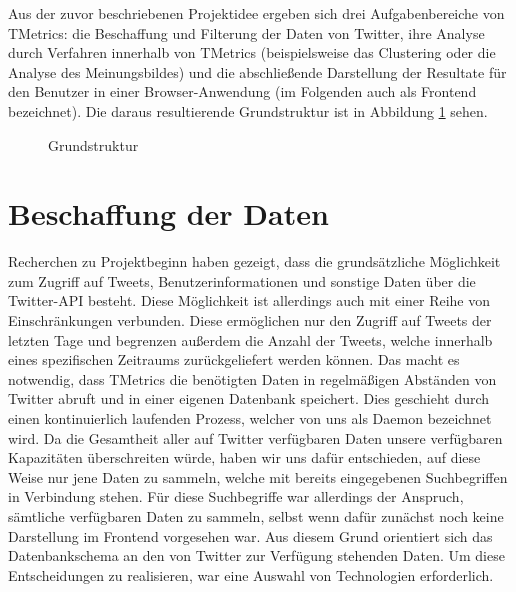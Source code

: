 Aus der zuvor beschriebenen Projektidee ergeben sich drei Aufgabenbereiche von TMetrics: die Beschaffung und Filterung der Daten von Twitter, ihre Analyse durch Verfahren innerhalb von TMetrics (beispielsweise das Clustering oder die Analyse des Meinungsbildes) und die abschließende Darstellung der Resultate für den Benutzer in einer Browser-Anwendung (im Folgenden auch als Frontend bezeichnet). Die daraus resultierende Grundstruktur ist in Abbildung \ref{arch1} sehen.

\begin{figure}[h]
\centering
\scalebox{0.7}{}
\caption{Grundstruktur}
\label{arch1}
\end{figure}

\section{Beschaffung der Daten}

Recherchen zu Projektbeginn haben gezeigt, dass die grundsätzliche Möglichkeit zum Zugriff auf Tweets, Benutzerinformationen und sonstige Daten über die Twitter-API besteht. Diese Möglichkeit ist allerdings auch mit einer Reihe von Einschränkungen verbunden. Diese ermöglichen nur den Zugriff auf Tweets der letzten Tage und begrenzen außerdem die Anzahl der Tweets, welche innerhalb eines spezifischen Zeitraums zurückgeliefert werden können. Das macht es notwendig, dass TMetrics die benötigten Daten in regelmäßigen Abständen von Twitter abruft und in einer eigenen Datenbank speichert. Dies geschieht durch einen kontinuierlich laufenden Prozess, welcher von uns als Daemon bezeichnet wird. Da die Gesamtheit aller auf Twitter verfügbaren Daten unsere verfügbaren Kapazitäten überschreiten würde, haben wir uns dafür entschieden, auf diese Weise nur jene Daten zu sammeln, welche mit bereits eingegebenen Suchbegriffen in Verbindung stehen. Für diese Suchbegriffe war allerdings der Anspruch, sämtliche verfügbaren Daten zu sammeln, selbst wenn dafür zunächst noch keine Darstellung im Frontend vorgesehen war. Aus diesem Grund orientiert sich das Datenbankschema an den von Twitter zur Verfügung stehenden Daten. Um diese Entscheidungen zu realisieren, war eine Auswahl von Technologien erforderlich. 

